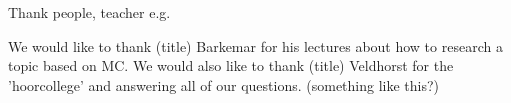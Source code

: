 Thank people, teacher e.g.

We would like to thank (title) Barkemar for his lectures about how to research a topic based on MC. We would also like to thank (title) Veldhorst for the 'hoorcollege' and answering all of our questions. (something like this?)